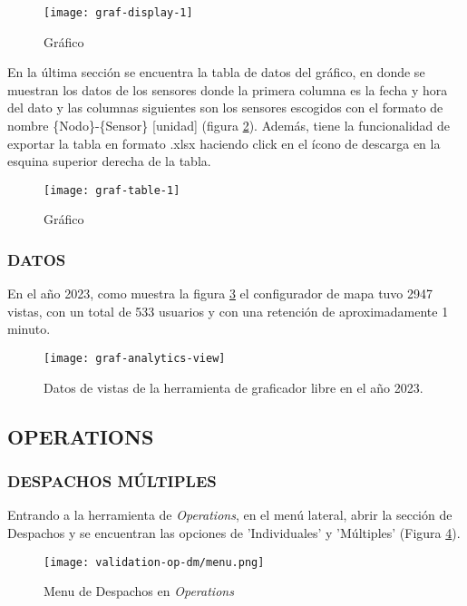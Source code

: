 \begin{figure}[H]
	\centering
	\texttt{[image: graf-display-1]}
	\caption{\label{fig:graf-display-1} Gráfico}
\end{figure}

En la última sección se encuentra la tabla de datos del gráfico, en donde se muestran los datos de los sensores donde la primera columna es la fecha y hora del dato y las columnas siguientes son los sensores escogidos con el formato de nombre \{Nodo\}-\{Sensor\} [unidad] (figura \ref{fig:graf-table-1}). 
Además, tiene la funcionalidad de exportar la tabla en formato .xlsx haciendo click en el ícono de descarga en la esquina superior derecha de la tabla.

\begin{figure}[H]
	\centering
	\texttt{[image: graf-table-1]}
	\caption{\label{fig:graf-table-1} Gráfico}
\end{figure}


\subsubsection{DATOS}

En el año 2023, como muestra la figura \ref{fig:graf-analytics-view} el configurador de mapa tuvo 2947 vistas, con un total de 533 usuarios y con una retención de aproximadamente 1 minuto.
\begin{figure}[H]
	\centering
	\texttt{[image: graf-analytics-view]}
	\caption{\label{fig:graf-analytics-view} Datos de vistas de la herramienta de graficador libre en el año 2023.}
\end{figure}


\subsection{OPERATIONS}

\subsubsection{DESPACHOS MÚLTIPLES}

Entrando a la herramienta de \textit{Operations}, en el menú lateral, abrir la sección de Despachos y se encuentran las opciones de 'Individuales' y 'Múltiples' (Figura \ref{fig:op-menu}).

\begin{figure}[H]
	\centering
	\texttt{[image: validation-op-dm/menu.png]}
	\caption{\label{fig:op-menu} Menu de Despachos en \textit{Operations}}
\end{figure}

